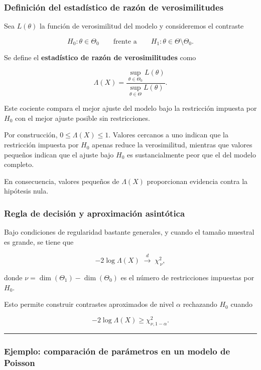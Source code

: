 \documentclass[
]{article}
\begin{document}
\subsubsection{Definición del estadístico de razón de verosimilitudes}\label{definiciuxf3n-del-estaduxedstico-de-razuxf3n-de-verosimilitudes}

Sea \(L(\theta)\) la función de verosimilitud del modelo y consideremos el contraste

\[
H_0:\theta\in\Theta_0
\qquad \text{frente a} \qquad
H_1:\theta\in\Theta\setminus\Theta_0.
\]

Se define el \textbf{estadístico de razón de verosimilitudes} como

\[
\Lambda(X)
=
\frac{\sup_{\theta\in\Theta_0} L(\theta)}
{\sup_{\theta\in\Theta} L(\theta)}.
\]

Este cociente compara el mejor ajuste del modelo bajo la restricción impuesta por \(H_0\) con el mejor ajuste posible sin restricciones.

Por construcción, \(0\le\Lambda(X)\le 1\). Valores cercanos a uno indican que la restricción impuesta por \(H_0\) apenas reduce la verosimilitud, mientras que valores pequeños indican que el ajuste bajo \(H_0\) es sustancialmente peor que el del modelo completo.

En consecuencia, valores pequeños de \(\Lambda(X)\) proporcionan evidencia contra la hipótesis nula.

\subsubsection{Regla de decisión y aproximación asintótica}\label{regla-de-decisiuxf3n-y-aproximaciuxf3n-asintuxf3tica}

Bajo condiciones de regularidad bastante generales, y cuando el tamaño muestral es grande, se tiene que

\[
-2\log\Lambda(X)
\;\xrightarrow{d}\;
\chi^2_{\,\nu},
\]

donde \(\nu=\dim(\Theta_1)-\dim(\Theta_0)\) es el número de restricciones impuestas por \(H_0\).

Esto permite construir contrastes aproximados de nivel \(\alpha\) rechazando \(H_0\) cuando

\[
-2\log\Lambda(X)\ge \chi^2_{\nu,1-\alpha}.
\]

\begin{center}\rule{0.5\linewidth}{0.5pt}\end{center}

\subsubsection{Ejemplo: comparación de parámetros en un modelo de Poisson}\label{ejemplo-comparaciuxf3n-de-paruxe1metros-en-un-modelo-de-poisson}
\end{document}
